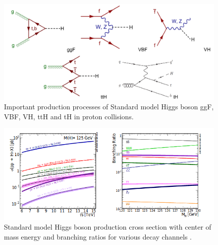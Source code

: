 \documentclass[final,3p]{CSP}
\begin{document}
\begin{figure}[H]
	\centering
	\includegraphics[width=\columnwidth]{./pg.png}
	\caption{Important production processes of Standard model Higgs boson ggF, VBF, VH, ttH and tH in proton collisions.}
	\label{figure 2}
\end{figure}


\begin{figure}[H]
  \centering
   \includegraphics[scale=0.7]{./cd2.png}
  \caption{Standard model Higgs boson production cross section with center of mass energy and branching ratios for various decay channels \cite{Tanabashi:2018oca}.}
   \label{figure 3}
\end{figure}
\clearpage

 \newpage
\end{document}
